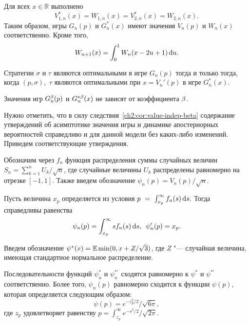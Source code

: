 {\begin{theorem}
  Для всех $x \in \mathbb{R}$ выполнено
  \begin{equation}\label{ch2:eq:duality-relationships}
    V_{1,n}^*(x) = W_{1,n}(x) = V_{2,n}^*(x) = W_{2,n}(x).
  \end{equation}
  Таким образом, игры $G_n(p)$ и $G_n^*(x)$ имеют значения $V_n(p)$ и $W_n(x)$ соответственно.
  Кроме того,
  \begin{equation}\label{ch2:eq:W-recursive}
    W_{n+1}(x) = \int_0^1 W_n(x - 2u + 1) \mathop{}\!\mathrm{d} u.
  \end{equation}
\end{theorem}

\begin{theorem}\label{ch2:thm:optimal-strategies}
  Стратегии $\sigma$ и $\tau$ являются оптимальными в игре $G_n(p)$ тогда и только тогда, когда $(p, \sigma),$ $\tau$ являются оптимальными при $x = V_n'(p)$ в игре $G_n^*(x)$.
\end{theorem}

\begin{corollary}
  \label{ch2:cor:value-indep-beta}
  Значения игр $G^{\beta}_n(p)$ и $G^{*\beta}_n(x)$ не зависят от коэффициента $\beta$.
\end{corollary}

Нужно отметить, что в силу следствия~\ref{ch2:cor:value-indep-beta} содержание утверждений об асимптотике значения игры и динамике апостериорных вероятностей справедливо и для данной модели без каких-либо изменений.
Приведем соответствующие утверждения.

Обозначим через $f_n$ функция распределения суммы случайных величин $S_n = \sum_{k=1}^n U_k / \sqrt{n}$, где случайные величины $U_k$ распределены равномерно на отрезке $[-1, 1]$.
Также введем обозначение $\psi_n(p) = V_n(p)/\sqrt{n}$.

\begin{proposition}
Пусть величина $x_p$ определяется из условия 
$
  p~=~\int_{x_p}^\infty f_n(s) \mathop{}\!\mathrm{d} s.
$
Тогда справедливы равенства
\begin{equation*}
  \psi_n(p) = \int_{x_p}^\infty s f_n(s) \mathop{}\!\mathrm{d} s, \enskip
  \psi'_n(p) = x_p.
\end{equation*}
\end{proposition}

Введем обозначение $\psi^*(x) = \operatorname{\mathbb{E}} \min(0, x + Z/\sqrt{3})$, где $Z$ "--- случайная величина, имеющая стандартное нормальное распределение.

\begin{proposition}
Последовательности функций $\psi^*_n$ и $\psi^{*\prime}_n$ сходятся равномерно к $\psi^*$ и $\psi^{*\prime}$ соответственно.
Более того, $\psi_n(p)$ равномерно сходится к функции $\psi(p)$, которая определяется следующим образом:
\begin{equation*}
  \psi(p) = e^{-z_p^2/2}/\sqrt{6\pi},
\end{equation*}
где $z_p$ удовлетворяет равенству $p = \int_{z_p}^\infty e^{-s^2/2}/\sqrt{2\pi}$.
\end{proposition}

}
